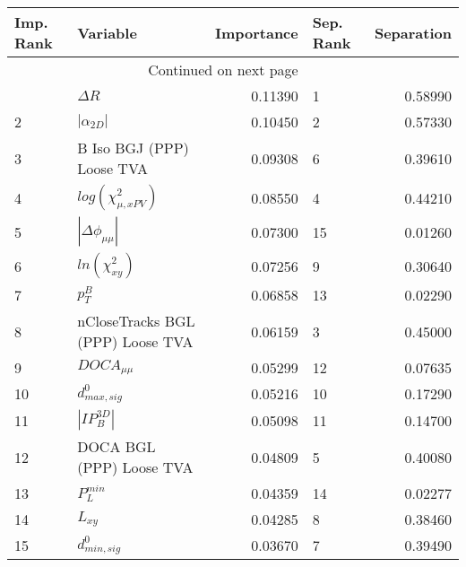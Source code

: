\usepackage{lscape}

\begin{landscape}
\begin{longtable}{llrlr}
\toprule
Imp. Rank &                          Variable &  Importance & Sep. Rank &  Separation \\
\midrule
\endhead
\midrule
\multicolumn{3}{r}{{Continued on next page}} \\
\midrule
\endfoot

\bottomrule
\endlastfoot
        1 &                        $\Delta R$ &     0.11390 &         1 &     0.58990 \\
        2 &                   $|\alpha_{2D}|$ &     0.10450 &         2 &     0.57330 \\
        3 &         B Iso BGJ (PPP) Loose TVA &     0.09308 &         6 &     0.39610 \\
        4 &         $log(\chi^{2}_{\mu,xPV})$ &     0.08550 &         4 &     0.44210 \\
        5 &          $|\Delta \phi_{\mu\mu}|$ &     0.07300 &        15 &     0.01260 \\
        6 &               $ln(\chi^{2}_{xy})$ &     0.07256 &         9 &     0.30640 \\
        7 &                         $p^B_{T}$ &     0.06858 &        13 &     0.02290 \\
        8 &  nCloseTracks BGL (PPP) Loose TVA &     0.06159 &         3 &     0.45000 \\
        9 &                   $DOCA_{\mu\mu}$ &     0.05299 &        12 &     0.07635 \\
       10 &                  $d^0_{max, sig}$ &     0.05216 &        10 &     0.17290 \\
       11 &                   $|IP_{B}^{3D}|$ &     0.05098 &        11 &     0.14700 \\
       12 &          DOCA BGL (PPP) Loose TVA &     0.04809 &         5 &     0.40080 \\
       13 &                     $P^{min}_{L}$ &     0.04359 &        14 &     0.02277 \\
       14 &                          $L_{xy}$ &     0.04285 &         8 &     0.38460 \\
       15 &                  $d^0_{min, sig}$ &     0.03670 &         7 &     0.39490 \\
\end{longtable}

\end{landscape}
